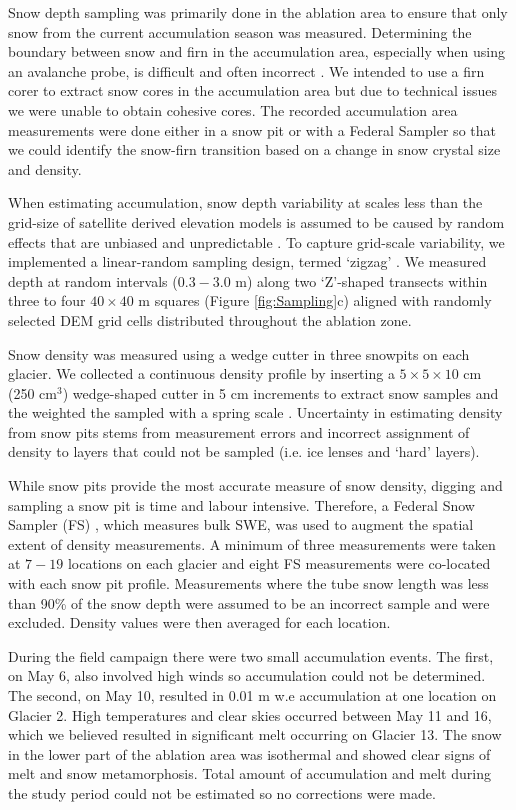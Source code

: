 \documentclass[twocolumn,letterpaper]{igs}
\begin{document}
Snow depth sampling was primarily done in the ablation area to ensure that only snow from the current accumulation season was measured. Determining the boundary between snow and firn in the accumulation area, especially when using an avalanche probe, is difficult and often incorrect \citep{Grunewald2010,Sold2013}. We intended to use a firn corer to extract snow cores in the accumulation area but due to technical issues we were unable to obtain cohesive cores. The recorded accumulation area measurements were done either in a snow pit or with a Federal Sampler so that we could identify the snow-firn transition based on a change in snow crystal size and density. 

When estimating accumulation, snow depth variability at scales less than the grid-size of satellite derived elevation models is assumed to be caused by random effects that are unbiased and unpredictable \citep{Watson2006}. To capture grid-scale variability, we implemented a linear-random sampling design, termed `zigzag' \citep{Shea2010}. We measured depth at random intervals ($0.3 - 3.0$ m) along two `Z'-shaped transects within three to four $40\times40$ m squares (Figure \ref{fig:Sampling}c) aligned with randomly selected DEM grid cells distributed throughout the ablation zone.

Snow density was measured using a wedge cutter in three snowpits on each glacier. We collected a continuous density profile by inserting a $5\times5\times 10$ cm (250 cm$^3$) wedge-shaped cutter in 5 cm increments to extract snow samples and the weighted the sampled with a spring scale \citep[e.g.][]{Gray1981,Fierz2009}. Uncertainty in estimating density from snow pits stems from measurement errors and incorrect assignment of density to layers that could not be sampled (i.e. ice lenses and `hard' layers). 

While snow pits provide the most accurate measure of snow density, digging and sampling a snow pit is time and labour intensive. Therefore, a Federal Snow Sampler (FS) \citep{Clyde1932}, which measures bulk SWE, was used to augment the spatial extent of density measurements. A minimum of three measurements were taken at $7-19$ locations on each glacier and eight FS measurements were co-located with each snow pit profile. Measurements where the tube snow length was less than 90\% of the snow depth were assumed to be an incorrect sample and were excluded. Density values were then averaged for each location. 

During the field campaign there were two small accumulation events. The first, on May 6, also involved high winds so accumulation could not be determined. The second, on May 10, resulted in 0.01 m w.e accumulation at one location on Glacier 2. High temperatures and clear skies occurred between May 11 and 16, which we believed resulted in significant melt occurring on Glacier 13. The snow in the lower part of the ablation area was isothermal and showed clear signs of melt and snow metamorphosis. Total amount of accumulation and melt during the study period could not be estimated so no corrections were made. 
\end{document}
